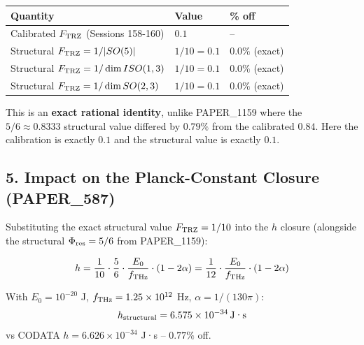 \documentclass[
]{article}
\newcounter{none} %
\begin{document}
{\def\LTcaptype{none} %
\begin{longtable}[]{@{}
  >{\raggedright\arraybackslash}p{}
  >{\raggedleft\arraybackslash}p{}
  >{\raggedleft\arraybackslash}p{}@{}}
\toprule\noalign{}
\begin{minipage}[b]{\linewidth}\raggedright
Quantity
\end{minipage} & \begin{minipage}[b]{\linewidth}\raggedleft
Value
\end{minipage} & \begin{minipage}[b]{\linewidth}\raggedleft
\% off
\end{minipage} \\
\midrule\noalign{}
\endhead
\bottomrule\noalign{}
\endlastfoot
Calibrated \(F_{\rm TRZ}\) (Sessions 158-160) & \(0.1\) & -- \\
Structural \(F_{\rm TRZ} = 1/|SO(5)|\) & \(1/10 = 0.1\) &
\(\mathbf{0.0\%}\) (exact) \\
Structural \(F_{\rm TRZ} = 1/\dim ISO(1,3)\) & \(1/10 = 0.1\) &
\(0.0\%\) (exact) \\
Structural \(F_{\rm TRZ} = 1/\dim SO(2,3)\) & \(1/10 = 0.1\) & \(0.0\%\)
(exact) \\
\end{longtable}
}

This is an \textbf{exact rational identity}, unlike PAPER\_1159 where
the \(5/6 \approx 0.8333\) structural value differed by \(0.79\%\) from
the calibrated \(0.84\). Here the calibration is exactly \(0.1\) and the
structural value is exactly \(0.1\).

\subsection{5. Impact on the Planck-Constant Closure
(PAPER\_587)}\label{impact-on-the-planck-constant-closure-paper_587}

Substituting the exact structural value \(F_{\rm TRZ} = 1/10\) into the
\(h\) closure (alongside the structural \(\Phi_{\rm res} = 5/6\) from
PAPER\_1159):

\[h = \frac{1}{10} \cdot \frac{5}{6} \cdot \frac{E_0}{f_{\rm THz}} \cdot (1 - 2\alpha) = \frac{1}{12} \cdot \frac{E_0}{f_{\rm THz}} \cdot (1 - 2\alpha)\]

With \(E_0 = 10^{-20}\) J, \(f_{\rm THz} = 1.25 \times 10^{12}\) Hz,
\(\alpha = 1/(130\pi)\):
\[h_{\rm structural} = 6.575 \times 10^{-34}\,\text{J·s}\] vs CODATA
\(h = 6.626 \times 10^{-34}\) J·s -- \(\mathbf{0.77\%}\) off.
\end{document}

